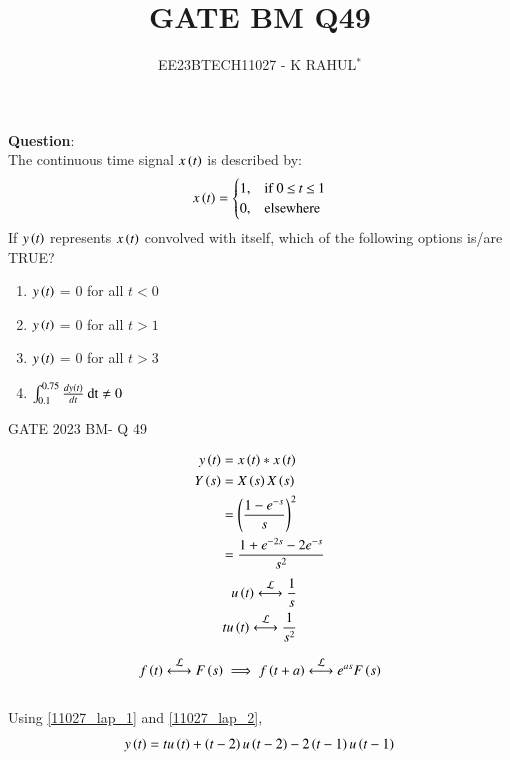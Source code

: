 \documentclass[journal,12pt,twocolumn]{IEEEtran}
\theoremstyle{remark}
\begin{document}

\vspace{3cm}
\title{GATE BM Q49}
\author{EE23BTECH11027 - K RAHUL$^{*}$%
}
\maketitle
\newpage
\bigskip
\renewcommand{\thefigure}{\theenumi}
\renewcommand{\thetable}{\theenumi}
\textbf{Question}:\\
The continuous time signal $x\left(t\right)$ is described by:
\begin{align}
x\left(t\right)=
    \begin{cases}
        1, & \text{if } 0\: {\displaystyle \leq }\:t\:{\displaystyle \leq }\:1\\
        0, & \text{elsewhere}
    \end{cases} 
\end{align}
If $y\left(t\right)$ represents $x\left(t\right)$ convolved with itself, which of the following options is/are TRUE?
\begin{enumerate}[label = \Alph*]
    \item $y\left(t\right)$ = 0 for all $t<0$\\
    \item $y\left(t\right)$ = 0 for all $t>1$\\
    \item $y\left(t\right)$ = 0 for all $t>3$\\
    \item $\int_{0.1}^{0.75} \frac{dy\left(t\right)}{dt}\: \text{dt} \neq 0$
\end{enumerate} \hfill{GATE 2023 BM- Q 49}\\
\bigskip 
\bigskip
\solution
\begin{table}[ht]

\end{table}
\bigskip
\begin{align}
    y\left(t\right) &= x\left(t\right) * x\left(t\right)\\
    Y\left(s\right) &= X\left(s\right)X\left(s\right)\\
    &=\left(\frac{1-e^{-s}}{s}\right)^2\\
    &=\frac{1+e^{-2s}-2e^{-s}}{s^2}
\end{align}
\begin{align}
u\brak{t} \system{L} \frac{1}{s}\\
tu\brak{t} \system{L} \frac{1}{s^2} \label{11027_lap_1}
\end{align}
	
\begin{align}
    f\brak{t} \system{L} F\brak{s}  \implies f\brak{t+a} \system{L} e^{as}F\brak{s} \label{11027_lap_2}
\end{align}\\
Using \eqref{11027_lap_1} and \eqref{11027_lap_2}, 
\begin{align}
    y\left(t\right) = tu\left(t\right) + \left(t-2\right)u\left(t-2\right) -2\left(t-1\right)u\left(t-1\right) \label{11027_final_eqn}
\end{align}
\end{document}

